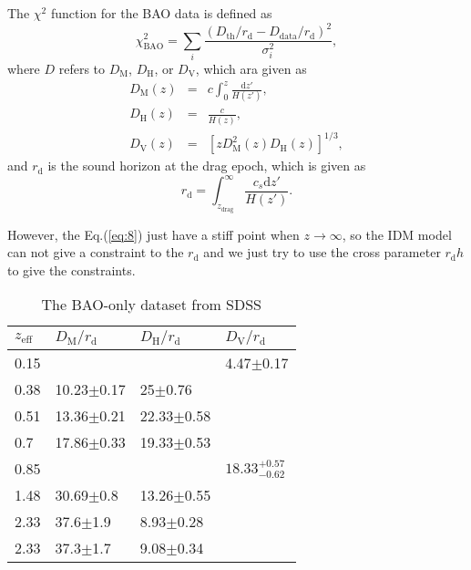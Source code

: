 \documentclass[twocolumn]{aastex631}
\begin{document}
   The $\chi^2$ function for the BAO data is defined as
   \begin{equation}
      \chi_{\text{BAO}}^2=\sum_i\frac{(D_{\text{th}}/r_{\text{d}}-D_{\text{data}}/r_{\text{d}})^2}{\sigma_i^2},
   \end{equation}
   where $D$ refers to $D_{\text{M}}$, $D_{\text{H}}$, or $D_{\text{V}}$, which ara given as
   \begin{eqnarray}
      D_{\text{M}}(z)&=&c\int_0^z\frac{\text{d}z'}{H(z')},\\
      D_{\text{H}}(z)&=&\frac{c}{H(z)},\\
      D_{\text{V}}(z)&=&\left[zD_{\text{M}}^2(z)D_{\text{H}}(z)\right]^{1/3},
   \end{eqnarray}
   and $r_{\text{d}}$ is the sound horizon at the drag epoch, which is given as
   \begin{equation}
      r_{\text{d}}=\int_{z_{\text{drag}}}^{\infty}\frac{c_s\text{d}z'}{H(z')}.
   \end{equation}

   However, the Eq.(\ref{eq:8}) just have a stiff point when $z\to\infty$, so the IDM
   model can not give a constraint to the $r_{\text{d}}$ and we just try to use the cross
   parameter $r_{\text{d}}h$ to give the constraints.

   \begin{table}[htbp]
      \caption{The BAO-only dataset from SDSS}
      \centering
      \begin{tabular}{llll}
         \hline\hline
         $z_{\text{eff}}$ & $D_{\text{M}}/r_{\text{d}}$ & $D_{\text{H}}/r_{\text{d}}$ & $D_{\text{V}}/r_{\text{d}}$ \\
         \hline
         0.15 & & & 4.47$\pm$0.17 \\
         0.38 & 10.23$\pm$0.17 & 25$\pm$0.76 & \\
         0.51 & 13.36$\pm$0.21 & 22.33$\pm$0.58 & \\
         0.7 & 17.86$\pm$0.33 & 19.33$\pm$0.53 & \\
         0.85 & & & $18.33_{-0.62}^{+0.57}$ \\
         1.48 & 30.69$\pm$0.8 & 13.26$\pm$0.55 & \\
         2.33 & 37.6$\pm$1.9 & 8.93$\pm$0.28 & \\
         2.33 & 37.3$\pm$1.7 & 9.08$\pm$0.34 & \\
         \hline
      \end{tabular}
      \label{tab:2}
   \end{table}
\end{document}
